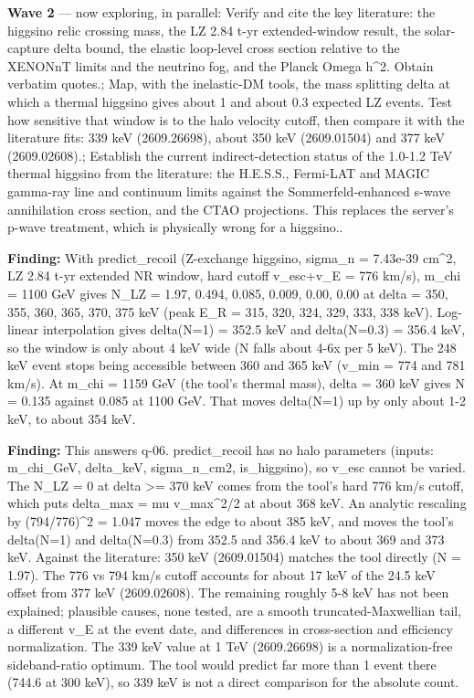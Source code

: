 \documentclass[11pt,a4paper]{article}
\begin{document}
\textbf{Wave 2} --- now exploring, in parallel: Verify and cite the key literature: the higgsino relic crossing mass, the LZ 2.84 t-yr extended-window result, the solar-capture delta bound, the elastic loop-level cross section relative to the XENONnT limits and the neutrino fog, and the Planck Omega h\textasciicircum{}2. Obtain verbatim quotes.; Map, with the inelastic-DM tools, the mass splitting delta at which a thermal higgsino gives about 1 and about 0.3 expected LZ events. Test how sensitive that window is to the halo velocity cutoff, then compare it with the literature fits: 339 keV (2609.26698), about 350 keV (2609.01504) and 377 keV (2609.02608).; Establish the current indirect-detection status of the 1.0-1.2 TeV thermal higgsino from the literature: the H.E.S.S., Fermi-LAT and MAGIC gamma-ray line and continuum limits against the Sommerfeld-enhanced s-wave annihilation cross section, and the CTAO projections. This replaces the server's p-wave treatment, which is physically wrong for a higgsino..

\textbf{Finding:} With predict\_recoil (Z-exchange higgsino, sigma\_n = 7.43e-39 cm\textasciicircum{}2, LZ 2.84 t-yr extended NR window, hard cutoff v\_esc+v\_E = 776 km/s), m\_chi = 1100 GeV gives N\_LZ = 1.97, 0.494, 0.085, 0.009, 0.00, 0.00 at delta = 350, 355, 360, 365, 370, 375 keV (peak E\_R = 315, 320, 324, 329, 333, 338 keV). Log-linear interpolation gives delta(N=1) = 352.5 keV and delta(N=0.3) = 356.4 keV, so the window is only about 4 keV wide (N falls about 4-6x per 5 keV). The 248 keV event stops being accessible between 360 and 365 keV (v\_min = 774 and 781 km/s). At m\_chi = 1159 GeV (the tool's thermal mass), delta = 360 keV gives N = 0.135 against 0.085 at 1100 GeV. That moves delta(N=1) up by only about 1-2 keV, to about 354 keV.

\textbf{Finding:} This answers q-06. predict\_recoil has no halo parameters (inputs: m\_chi\_GeV, delta\_keV, sigma\_n\_cm2, is\_higgsino), so v\_esc cannot be varied. The N\_LZ = 0 at delta \textgreater{}= 370 keV comes from the tool's hard 776 km/s cutoff, which puts delta\_max = mu v\_max\textasciicircum{}2/2 at about 368 keV. An analytic rescaling by (794/776)\textasciicircum{}2 = 1.047 moves the edge to about 385 keV, and moves the tool's delta(N=1) and delta(N=0.3) from 352.5 and 356.4 keV to about 369 and 373 keV. Against the literature: 350 keV (2609.01504) matches the tool directly (N = 1.97). The 776 vs 794 km/s cutoff accounts for about 17 keV of the 24.5 keV offset from 377 keV (2609.02608). The remaining roughly 5-8 keV has not been explained; plausible causes, none tested, are a smooth truncated-Maxwellian tail, a different v\_E at the event date, and differences in cross-section and efficiency normalization. The 339 keV value at 1 TeV (2609.26698) is a normalization-free sideband-ratio optimum. The tool would predict far more than 1 event there (744.6 at 300 keV), so 339 keV is not a direct comparison for the absolute count.
\end{document}
